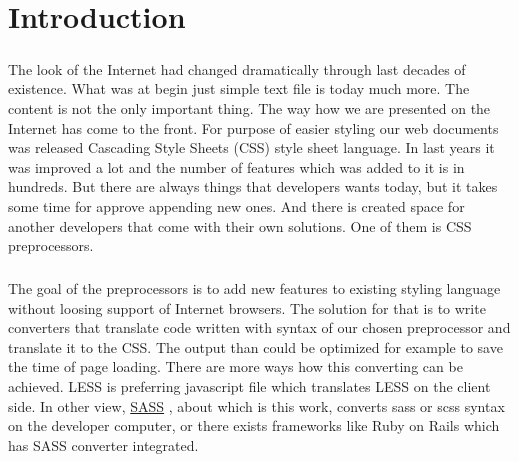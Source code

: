 \chapter*{Introduction}
\paragraph{}
The look of the Internet had changed dramatically through last decades of existence. What was at begin just simple text file is today much more. The content is not the only important thing. The way how we are presented on the Internet has come to the front. For purpose of easier styling our web documents was released Cascading Style Sheets (CSS) style sheet language. In last years it was improved a lot and the number of features which was added to it is in hundreds. But there are always things that developers wants today, but it takes some time for approve appending new ones. And there is created space for another developers that come with their own solutions. One of them is CSS preprocessors.

\paragraph{}
The goal of the preprocessors is to add new features to existing styling language without loosing support of Internet browsers. The solution for that is to write converters that translate code written with syntax of our chosen preprocessor and translate it to the CSS. The output than could be optimized for example to save the time of page loading. There are more ways how this converting can be achieved. LESS is preferring javascript file which translates LESS on the client side. In other view, \href{http://sass-lang.com}{SASS} \cite{homepage:sass}, about which is this work, converts sass or scss syntax on the developer computer, or there exists frameworks like Ruby on Rails which has SASS converter integrated.

